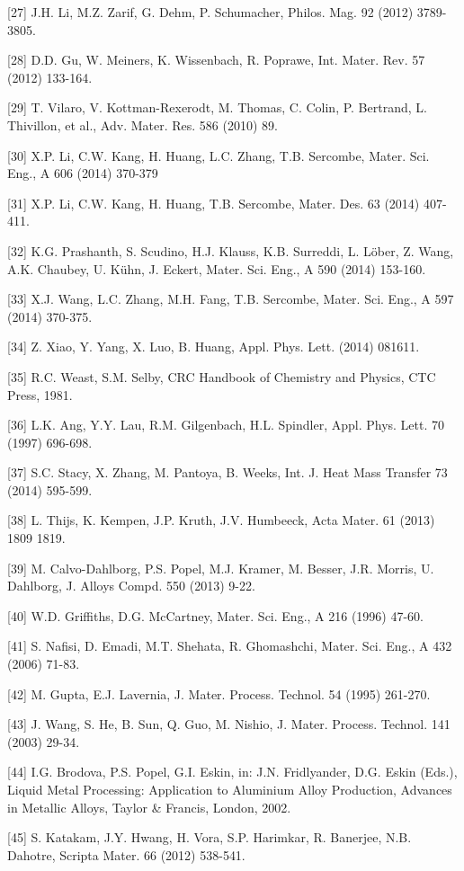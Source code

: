 \documentclass[10pt]{article}
\begin{document}
[27] J.H. Li, M.Z. Zarif, G. Dehm, P. Schumacher, Philos. Mag. 92 (2012) 3789-3805.

[28] D.D. Gu, W. Meiners, K. Wissenbach, R. Poprawe, Int. Mater. Rev. 57 (2012) 133-164.

[29] T. Vilaro, V. Kottman-Rexerodt, M. Thomas, C. Colin, P. Bertrand, L. Thivillon, et al., Adv. Mater. Res. 586 (2010) 89.

[30] X.P. Li, C.W. Kang, H. Huang, L.C. Zhang, T.B. Sercombe, Mater. Sci. Eng., A 606 (2014) 370-379

[31] X.P. Li, C.W. Kang, H. Huang, T.B. Sercombe, Mater. Des. 63 (2014) 407-411.

[32] K.G. Prashanth, S. Scudino, H.J. Klauss, K.B. Surreddi, L. Löber, Z. Wang, A.K. Chaubey, U. Kühn, J. Eckert, Mater. Sci. Eng., A 590 (2014) 153-160.

[33] X.J. Wang, L.C. Zhang, M.H. Fang, T.B. Sercombe, Mater. Sci. Eng., A 597 (2014) 370-375.

[34] Z. Xiao, Y. Yang, X. Luo, B. Huang, Appl. Phys. Lett. (2014) 081611.

[35] R.C. Weast, S.M. Selby, CRC Handbook of Chemistry and Physics, CTC Press, 1981.

[36] L.K. Ang, Y.Y. Lau, R.M. Gilgenbach, H.L. Spindler, Appl. Phys. Lett. 70 (1997) 696-698.

[37] S.C. Stacy, X. Zhang, M. Pantoya, B. Weeks, Int. J. Heat Mass Transfer 73 (2014) 595-599.

[38] L. Thijs, K. Kempen, J.P. Kruth, J.V. Humbeeck, Acta Mater. 61 (2013) 1809 1819.

[39] M. Calvo-Dahlborg, P.S. Popel, M.J. Kramer, M. Besser, J.R. Morris, U. Dahlborg, J. Alloys Compd. 550 (2013) 9-22.

[40] W.D. Griffiths, D.G. McCartney, Mater. Sci. Eng., A 216 (1996) 47-60.

[41] S. Nafisi, D. Emadi, M.T. Shehata, R. Ghomashchi, Mater. Sci. Eng., A 432 (2006) 71-83.

[42] M. Gupta, E.J. Lavernia, J. Mater. Process. Technol. 54 (1995) 261-270.

[43] J. Wang, S. He, B. Sun, Q. Guo, M. Nishio, J. Mater. Process. Technol. 141 (2003) 29-34.

[44] I.G. Brodova, P.S. Popel, G.I. Eskin, in: J.N. Fridlyander, D.G. Eskin (Eds.), Liquid Metal Processing: Application to Aluminium Alloy Production, Advances in Metallic Alloys, Taylor \& Francis, London, 2002.

[45] S. Katakam, J.Y. Hwang, H. Vora, S.P. Harimkar, R. Banerjee, N.B. Dahotre, Scripta Mater. 66 (2012) 538-541.
\end{document}
